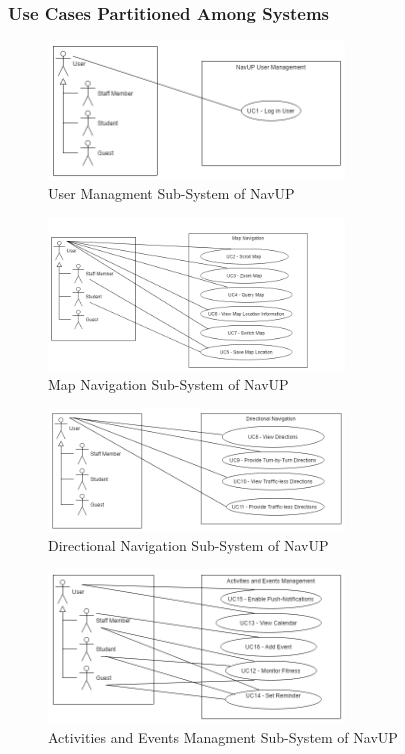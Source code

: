 \documentclass[runningheads,a4paper]{article}
\begin{document}
\pagebreak

\subsubsection{Use Cases Partitioned Among Systems}

\begin{figure}[H]
   	\centering
   	\includegraphics[width=0.7\textwidth]{UserManagement.jpg}
   	\caption{User Managment Sub-System of NavUP}
\end{figure}

\begin{figure}[H]
   	\centering
   	\includegraphics[width=0.7\textwidth]{MapNavigation.jpg}
   	\caption{Map Navigation Sub-System of NavUP}
\end{figure}

\begin{figure}[H]
   	\centering
   	\includegraphics[width=0.7\textwidth]{DirectionalNavigation.jpg}
   	\caption{Directional Navigation Sub-System of NavUP}
\end{figure}

\begin{figure}[H]
   	\centering
   	\includegraphics[width=0.7\textwidth]{ActivitiesAndEventsManagement.jpg}
   	\caption{Activities and Events Managment Sub-System of NavUP}
\end{figure}
\end{document}
